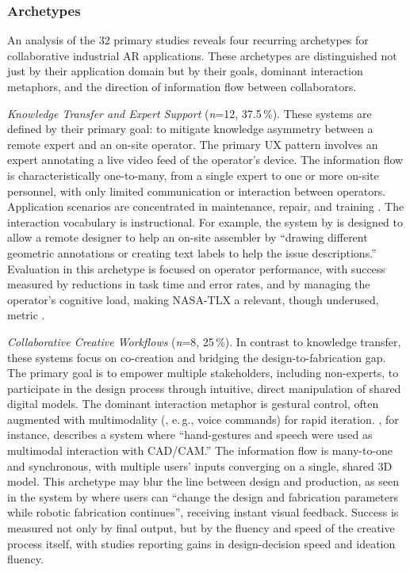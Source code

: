 \subsubsection{Archetypes}
An analysis of the 32 primary studies reveals four recurring archetypes for collaborative industrial AR applications. These archetypes are distinguished not just by their application domain but by their goals, dominant interaction metaphors, and the direction of information flow between collaborators.

\emph{Knowledge Transfer and Expert Support} (\textit{n}=12, 37.5\,\%).  
These systems are defined by their primary goal: to mitigate knowledge asymmetry between a remote expert and an on-site operator. The primary UX pattern involves an expert annotating a live video feed of the operator's device. The information flow is characteristically one-to-many, from a single expert to one or more on-site personnel, with only limited communication or interaction between operators. Application scenarios are concentrated in maintenance, repair, and training \cite{aschenbrenner2019comparing,putri2024enhancing}.
The interaction vocabulary is instructional. For example, the system by \cite{wang2022crossPlatform} is designed to allow a remote designer to help an on-site assembler by ``drawing different geometric annotations or creating text labels to help the issue descriptions.'' Evaluation in this archetype is focused on operator performance, with success measured by reductions in task time and error rates, and by managing the operator's cognitive load, making NASA-TLX a relevant, though underused, metric \cite{aschenbrenner2019comparing}.

\emph{Collaborative Creative Workflows} (\textit{n}=8, 25\,\%).  
In contrast to knowledge transfer, these systems focus on co-creation and bridging the design-to-fabrication gap. The primary goal is to empower multiple stakeholders, including non-experts, to participate in the design process through intuitive, direct manipulation of shared digital models. The dominant interaction metaphor is gestural control, often augmented with multimodality (, e.\,g., voice commands) for rapid iteration. \cite{betti2019pop}, for instance, describes a system where ``hand-gestures and speech were used as multimodal interaction with CAD/CAM.'' The information flow is many-to-one and synchronous, with multiple users' inputs converging on a single, shared 3D model. This archetype may blur the line between design and production, as seen in the system by \cite{buyruk2022interactive} where users can ``change the design and fabrication parameters while robotic fabrication continues'', receiving instant visual feedback. Success is measured not only by final output, but by the fluency and speed of the creative process itself, with studies reporting gains in design-decision speed and ideation fluency\cite{buyruk2022interactive,mourtzis2021collaborative}.

